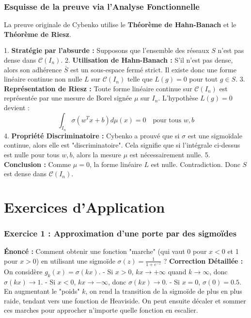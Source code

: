 \documentclass[11pt,a4paper]{article}
\begin{document}
\subsubsection{Esquisse de la preuve via l'Analyse Fonctionnelle}

La preuve originale de Cybenko utilise le \textbf{Théorème de Hahn-Banach} et le \textbf{Théorème de Riesz}.

1. \textbf{Stratégie par l'absurde :} Supposons que l'ensemble des réseaux $S$ n'est pas dense dans $\mathcal{C}(I_n)$.
2. \textbf{Utilisation de Hahn-Banach :} S'il n'est pas dense, alors son adhérence $\bar{S}$ est un sous-espace fermé strict. Il existe donc une forme linéaire continue non nulle $L$ sur $\mathcal{C}(I_n)$ telle que $L(g) = 0$ pour tout $g \in S$.
3. \textbf{Représentation de Riesz :} Toute forme linéaire continue sur $\mathcal{C}(I_n)$ est représentée par une mesure de Borel signée $\mu$ sur $I_n$. L'hypothèse $L(g)=0$ devient :
   $$\int_{I_n} \sigma(w^T x + b) d\mu(x) = 0 \quad \text{pour tous } w, b$$
4. \textbf{Propriété Discriminatoire :} Cybenko a prouvé que si $\sigma$ est une sigmoïdale continue, alors elle est "discriminatoire". Cela signifie que si l'intégrale ci-dessus est nulle pour tous $w, b$, alors la mesure $\mu$ est nécessairement nulle.
5. \textbf{Conclusion :} Comme $\mu = 0$, la forme linéaire $L$ est nulle. Contradiction. Donc $S$ est dense dans $\mathcal{C}(I_n)$.

\section{Exercices d'Application}

\subsubsection{Exercice 1 : Approximation d'une porte par des sigmoïdes}
\textbf{Énoncé :} Comment obtenir une fonction "marche" (qui vaut 0 pour $x < 0$ et 1 pour $x > 0$) en utilisant une sigmoïde $\sigma(z) = \frac{1}{1+e^{-z}}$ ?
\textbf{Correction Détaillée :}
On considère $g_k(x) = \sigma(kx)$.
- Si $x > 0$, $kx \to +\infty$ quand $k \to \infty$, donc $\sigma(kx) \to 1$.
- Si $x < 0$, $kx \to -\infty$, donc $\sigma(kx) \to 0$.
- Si $x = 0$, $\sigma(0) = 0.5$.
En augmentant le "poids" $k$, on rend la transition de la sigmoïde de plus en plus raide, tendant vers une fonction de Heaviside. On peut ensuite décaler et sommer ces marches pour approcher n'importe quelle fonction en escalier.
\end{document}
